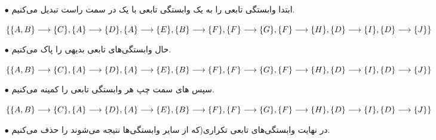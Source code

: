 \documentclass{article}
\begin{document}
\begin{itemize}
    \item [$\bullet$] ابتدا وابستگی تابعی را به یک وابستگی تابعی با یک  در سمت راست تبدیل می‌کنیم.

\begin{latin}
$
\{\\
\{A, B\}\longrightarrow\{C\},\\
\{A\}\longrightarrow\{D\},\\
\{A\}\longrightarrow\{E\},\\
\{B\}\longrightarrow\{F\},\\
\{F\}\longrightarrow\{G\},\\
\{F\}\longrightarrow\{H\},\\
\{D\}\longrightarrow\{I\},\\
\{D\}\longrightarrow\{J\}\\
\}
$
\end{latin}
    \item [$\bullet$] حال وابستگی‌های تابعی بدیهی را پاک می‌کنیم.
\begin{latin}
$
\{\\
\{A, B\}\longrightarrow\{C\},\\
\{A\}\longrightarrow\{D\},\\
\{A\}\longrightarrow\{E\},\\
\{B\}\longrightarrow\{F\},\\
\{F\}\longrightarrow\{G\},\\
\{F\}\longrightarrow\{H\},\\
\{D\}\longrightarrow\{I\},\\
\{D\}\longrightarrow\{J\}\\
\}
$
\end{latin}
    \item [$\bullet$] سپس های سمت چپ هر وابستگی تابعی را کمینه می‌کنیم.

\begin{latin}
$
\{\\
\{A, B\}\longrightarrow\{C\},\\
\{A\}\longrightarrow\{D\},\\
\{A\}\longrightarrow\{E\},\\
\{B\}\longrightarrow\{F\},\\
\{F\}\longrightarrow\{G\},\\
\{F\}\longrightarrow\{H\},\\
\{D\}\longrightarrow\{I\},\\
\{D\}\longrightarrow\{J\}\\
\}
$
\end{latin}
    \item [$\bullet$] در نهایت وابستگی‌های تابعی تکراری(که از سایر وابستگی‌ها نتیجه می‌شوند را حذف می‌کنیم.


\end{itemize}
\end{document}
